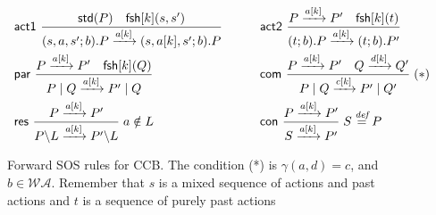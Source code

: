 \documentclass[runningheads]{llncs}
\newcommand{\Rule}[2]{\displaystyle{\frac{#1}{#2}}}
\newcommand{\paral}{\; \vert \;}
\newcommand{\rom}[1]{\mbox{\rm{#1}}}
\newcommand{\std}[1]{\mathsf{std}(#1)}
\newcommand{\fresh}[2]{\mathsf{fsh}[#1](#2)}
\newcommand{\bydef}{\stackrel{\emph{def}}{=}}
\newcommand{\rulename}[1]{\textsf{#1}}
\begin{document}
\begin{figure}
\vspace{-4ex}\[
\begin{array}{ll}
\rulename{act1}\ 
\Rule
{\std{P} \quad \fresh{k}{s,s'}}
{(s,a,s';b).P \xrightarrow{a[k]}(s,a[k],s';b).P}
\qquad &
\rulename{act2}\
\Rule
{P \xrightarrow{a[k]} P' \quad \fresh{k}{t}}
{(t;b).P \xrightarrow{a[k]} (t;b).P'}
\\[15pt]
\rulename{par}\
\Rule
{P \xrightarrow{a[k]} P'\quad \fresh{k}{Q}}
{P \paral Q \xrightarrow{a[k]} P' \paral Q}
\qquad &
\rulename{com}\
\Rule
{P \xrightarrow{a[k]} P' \quad Q \xrightarrow{d[k]} Q'}
{P \paral Q \xrightarrow{c[k]} P' \paral Q'}
\; (*)
%
\\[15pt]
\rulename{res}\
\Rule
{P \xrightarrow{a[k]} P'}
{P\backslash L \xrightarrow{a[k]} P'\backslash L}
\; a \notin L
\qquad &
\rulename{con}\
\Rule
{P \xrightarrow{a[k]} P'}
{S \xrightarrow{a[k]} P'}
\; S \bydef P
\end{array}
\] 
\vspace{-3ex}\caption[Forward SOS rules for CCB.]{Forward SOS rules for CCB. The condition (*) is $\gamma(a,d)=c$, 
and $b \in \mathcal{WA}$. Remember that $s$ is a mixed sequence of actions and past actions and $t$ is a sequence of purely past actions} \label{fig:fsos}
\vspace{-2ex}\end{figure}
\end{document}

